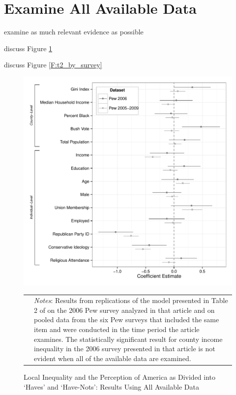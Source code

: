 
\section{Examine All Available Data}

examine as much relevant evidence as possible

discuss Figure \ref{F:t2_pooled}

discuss Figure \ref{F:t2_by_survey}


\begin{figure}[htbp] 
  \caption{Local Inequality and the Perception of America as Divided into `Haves' and `Have-Nots': Results Using All Available Data}
  \label{F:t2_pooled}
  \begin{center}
    \includegraphics[width=5.25in]{../figures/03_examine_all_available_data_t2.pdf}
  \end{center}
  \begin{footnotesize}
  \begin{tabular}{p{.1in} p{5.1in}}
  & \emph{Notes}: Results from replications of the model presented in Table 2 of \citet{Newman2015} on the 2006 Pew survey analyzed in that article and on pooled data from the six Pew surveys that included the same item and were conducted in the time period the article examines.  The statistically significant result for county income inequality in the 2006 survey presented in that article is not evident when all of the available data are examined.
  \end{tabular}
  \end{footnotesize}
\end{figure}

